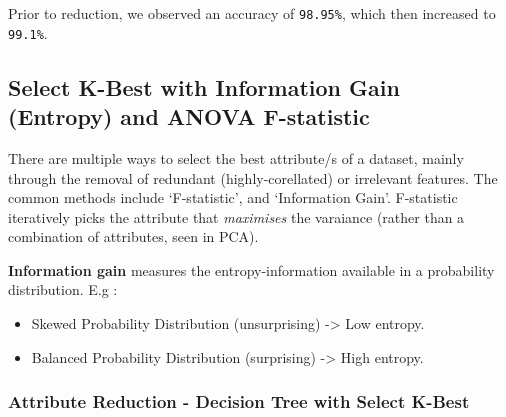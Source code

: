 \documentclass[11pt]{article}
\providecommand{\tightlist}{%
      \setlength{\itemsep}{0pt}\setlength{\parskip}{0pt}}
\begin{document}
Prior to reduction, we observed an accuracy of \texttt{98.95\%}, which
then increased to \texttt{99.1\%}.

    \hypertarget{select-k-best-with-information-gain-entropy-and-anova-f-statistic}{%
\subsection{Select K-Best with Information Gain (Entropy) and ANOVA
F-statistic}\label{select-k-best-with-information-gain-entropy-and-anova-f-statistic}}

There are multiple ways to select the best attribute/s of a dataset,
mainly through the removal of redundant (highly-corellated) or
irrelevant features. The common methods include `F-statistic', and
`Information Gain'. F-statistic iteratively picks the attribute that
\emph{maximises} the varaiance (rather than a combination of attributes,
seen in PCA).

\textbf{Information gain} measures the entropy-information available in
a probability distribution. E.g :

\begin{itemize}
\tightlist
\item
  Skewed Probability Distribution (unsurprising) -\textgreater{} Low
  entropy.
\item
  Balanced Probability Distribution (surprising) -\textgreater{} High
  entropy.
\end{itemize}

    \hypertarget{attribute-reduction---decision-tree-with-select-k-best}{%
\subsubsection{Attribute Reduction - Decision Tree with Select
K-Best}\label{attribute-reduction---decision-tree-with-select-k-best}}
\end{document}

